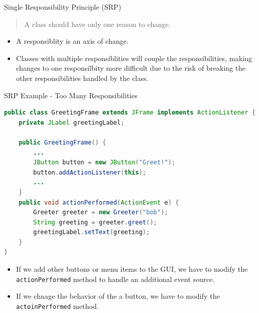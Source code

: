 \documentclass{beamer}
\begin{document}
\begin{frame}[fragile]{Single Responsibility Principle (SRP)}

\begin{quote}
A class should have only one reason to change.
\end{quote}

\begin{itemize}
\item A responsiblity is an axis of change.
\item Classes with multiple responsiblities will couple the responsibilities, making changes to one responsilbity more difficult due to the risk of breaking the other responsibilities handled by the class.
\end{itemize}


\end{frame}

\begin{frame}[fragile]{SRP Example - Too Many Responsibilities}

\vspace{-.1in}
\begin{lstlisting}[language=Java]
public class GreetingFrame extends JFrame implements ActionListener {
    private JLabel greetingLabel;

    public GreetingFrame() {
        ...
        JButton button = new JButton("Greet!");
        button.addActionListener(this);
        ...
    }
    public void actionPerformed(ActionEvent e) {
        Greeter greeter = new Greeter("bob");
        String greeting = greeter.greet();
        greetingLabel.setText(greeting);
    }
}
\end{lstlisting}
\vspace{-.1in}
\begin{itemize}
\item If we add other buttons or menu items to the GUI, we have to modify the {\tt actionPerformed} method to handle an additional event source.
\item If we chnage the behavior of the a button, we have to modify the {\tt actoinPerformed} method.
\end{itemize}


\end{frame}
\end{document}
